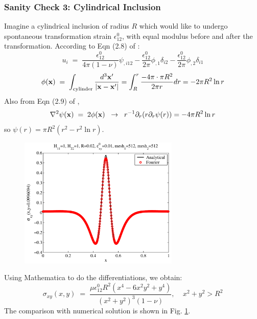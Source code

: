 \documentclass[12pt]{article}
\begin{document}
\subsubsection{Sanity Check 3: Cylindrical Inclusion}

Imagine a cylindrical inclusion of radius $R$ which would like to
undergo spontaneous transformation strain $\epsilon_{12}^0$, with
equal modulus before and after the transformation.  According to Eqn
(2.8) of \cite{Eshelby57}:
\begin{equation}
 u_i \;=\; \frac{\epsilon_{12}^0}{4\pi(1-\nu)}  \psi_{,i12} - 
           \frac{\epsilon_{12}^0}{2\pi}  \phi_{,1}\delta_{i2} - 
           \frac{\epsilon_{12}^0}{2\pi}  \phi_{,2}\delta_{i1}
\end{equation}
\begin{equation}
 \phi({\bf x}) \;=\; \int_{\rm cylinder} \frac{d^3{\bf x}'}{|{\bf x}-{\bf x}'|}
 = \int_R^r \frac{-4\pi\cdot \pi R^2}{2\pi r}dr 
 = -2\pi R^2 \ln r
\end{equation}
Also from Eqn (2.9) of \cite{Eshelby57}, 
\begin{equation}
 \nabla^2 \psi({\bf x}) \;=\; 
 2 \phi({\bf x})  \;\;\rightarrow\;\;
r^{-1} \partial_r ( r \partial_r \psi (r) ) = -4\pi R^2 \ln r
\end{equation}
so $\psi (r) = \pi R^2 (r^2 - r^2\ln r)$. 

\begin{figure}[th]
\centerline{\includegraphics[width=3in]{Figure/CylindricalInclusion}}
\caption{}
\label{CylindricalInclusion}
\end{figure}

Using Mathematica\cite{LiMathematica08} to do the differentiations, we
obtain:
\begin{equation}
 \sigma_{xy}(x,y) \;=\; 
 \frac{\mu \epsilon_{12}^0 R^2(x^4 - 6x^2y^2 + y^4)}{(x^2+y^2)^3(1-\nu)}, \;\;\;\;
 x^2+y^2>R^2
\end{equation}
The comparison with numerical solution is shown in
Fig. \ref{CylindricalInclusion}.
\end{document}
